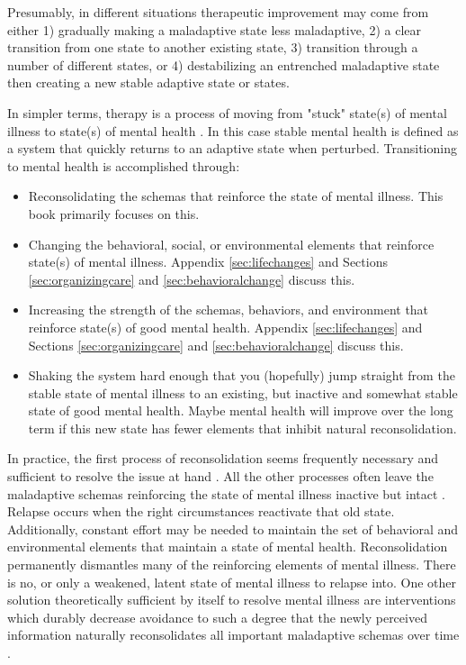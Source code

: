\documentclass[12pt,letterpaper]{book}
\begin{document}
Presumably, in different situations therapeutic improvement may come from either 1) gradually making a maladaptive state less maladaptive, 2) a clear transition from one state to another existing state, 3) transition through a number of different states, or 4) destabilizing an entrenched maladaptive state then creating a new stable adaptive state or states.

In simpler terms, therapy is a process of moving from "stuck" state(s) of mental illness to state(s) of mental health \cite{hayes2020complex,friston2010free}. In this case stable mental health is defined as a system that quickly returns to an adaptive state when perturbed. Transitioning to mental health is accomplished through:
\begin{itemize}
    \item Reconsolidating the schemas that reinforce the state of mental illness. This book primarily focuses on this.
    \item Changing the behavioral, social, or environmental elements that reinforce state(s) of mental illness. Appendix \ref{sec:lifechanges} and Sections \ref{sec:organizingcare} and \ref{sec:behavioralchange} discuss this.
    \item Increasing the strength of the schemas, behaviors, and environment that reinforce state(s) of good mental health. Appendix \ref{sec:lifechanges} and Sections \ref{sec:organizingcare} and \ref{sec:behavioralchange} discuss this.
    \item Shaking the system hard enough that you (hopefully) jump straight from the stable state of mental illness to an existing, but inactive and somewhat stable state of good mental health. Maybe mental health will improve over the long term if this new state has fewer elements that inhibit natural reconsolidation.
\end{itemize}
In practice, the first process of reconsolidation seems frequently necessary and sufficient to resolve the issue at hand \cite{eckerUnlocking}. All the other processes often leave the maladaptive schemas reinforcing the state of mental illness inactive but intact \cite{hayes2020complex,friston2010free}. Relapse occurs when the right circumstances reactivate that old state. Additionally, constant effort may be needed to maintain the set of behavioral and environmental elements that maintain a state of mental health. Reconsolidation permanently dismantles many of the reinforcing elements of mental illness. There is no, or only a weakened, latent state of mental illness to relapse into. One other solution theoretically sufficient by itself to resolve mental illness are interventions which durably decrease avoidance to such a degree that the newly perceived information naturally reconsolidates all important maladaptive schemas over time \cite{berghSelfEvidencing}.
\end{document}
